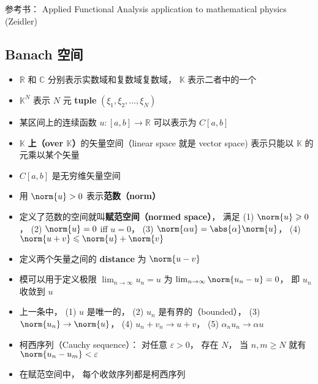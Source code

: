 
参考书： Applied Functional Analysis application to mathematical physics (Zeidler)

\subsection{Banach 空间}

\begin{itemize}
\item $\mathbb R$ 和 $\mathbb C$ 分别表示实数域和复数域复数域， $\mathbb K$ 表示二者中的一个

\item $\mathbb K^N$ 表示 $N$ 元 \textbf{tuple} $(\xi_1, \xi_2, \dots, \xi_N)$

\item 某区间上的连续函数 $u:[a, b] \to \mathbb{R}$ 可以表示为 $C[a, b]$

\item $\mathbb{K}$ \textbf{上（over $\mathbb K$）}的矢量空间（linear space 就是 vector space) 表示只能以 $\mathbb K$ 的元乘以某个矢量

\item $C[a, b]$ 是无穷维矢量空间

\item 用 $\norm{u} > 0$ 表示\textbf{范数（norm）}

\item 定义了范数的空间就叫\textbf{赋范空间（normed space）}， 满足 (1) $\norm{u} \geqslant 0$， (2) $\norm{u} = 0$ iff $u = 0$， (3) $\norm{\alpha u} = \abs{\alpha} \norm{u}$， (4) $\norm{u + v} \leqslant \norm{u} + \norm{v}$

\item 定义两个矢量之间的 \textbf{distance} 为 $\norm{u - v}$

\item 模可以用于定义极限 $\lim_{n\to\infty} u_n = u$ 为 $\lim_{n\to\infty} \norm{u_n - u} = 0$， 即 $u_n$ 收敛到 $u$

\item 上一条中， (1) $u$ 是唯一的， (2) $u_n$ 是有界的（bounded）， (3) $\norm{u_n} \to \norm{u}$， (4) $u_n + v_n \to u + v$， (5) $\alpha_n u_n \to \alpha u$

\item 柯西序列（Cauchy sequence）： 对任意 $\varepsilon > 0$， 存在 $N$， 当 $n, m \geqslant N$ 就有 $\norm{u_n - u_m} < \varepsilon$

\item 在赋范空间中， 每个收敛序列都是柯西序列


\end{itemize}

